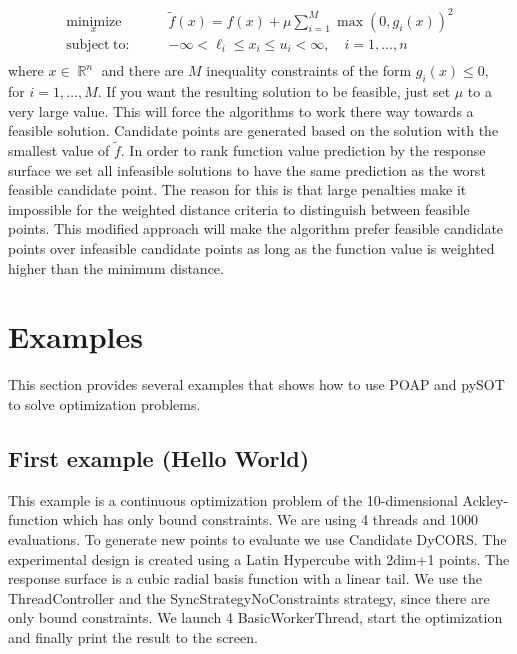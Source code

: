 \documentclass[]{article}
\DeclareMathOperator{\Rb}{\mathbb{R}}
\begin{document}
\begin{itemize}
\begin{align*}
\underset{x}{\operatorname{minimize}} \qquad &\widetilde{f}(x)=f(x)+\mu \sum_{i=1}^M \max(0,g_i(x))^2 \\
\operatorname{subject\;to:} \qquad &-\infty<\ell_i \leq x_i \leq u_i<\infty, \quad i = 1,\ldots,n \\
\end{align*}
where $x \in \Rb^n$ and there are $M$ inequality constraints of the form $g_i(x) \leq 0,$ for $i=1,\ldots,M$. If you want the resulting solution to be feasible, just set $\mu$ to a very large value. This will force the algorithms to work there way towards a feasible solution. Candidate points are generated based on the solution with the smallest value of $\widetilde{f}$. In order to rank function value prediction by the response surface we set all infeasible solutions to have the same prediction as the worst feasible candidate point. The reason for this is that large penalties make it impossible for the weighted distance criteria to distinguish between feasible points. This modified approach will make the algorithm prefer feasible candidate points over infeasible candidate points as long as the function value is weighted higher than the minimum distance.
\end{itemize}

\section{Examples}
This section provides several examples that shows how to use POAP and pySOT to solve optimization problems.

\subsection{First example (Hello World)}
This example is a continuous optimization problem of the 10-dimensional Ackley-function which has only bound constraints. We are using 4 threads and 1000 evaluations. To generate new points to evaluate we use Candidate DyCORS. The experimental design is created using a Latin Hypercube with 2dim+1 points. The response surface is a cubic radial basis function with a linear tail. We use the ThreadController and the SyncStrategyNoConstraints strategy, since there are only bound constraints. We launch 4 BasicWorkerThread, start the optimization and finally print the result to the screen.
\end{document}
